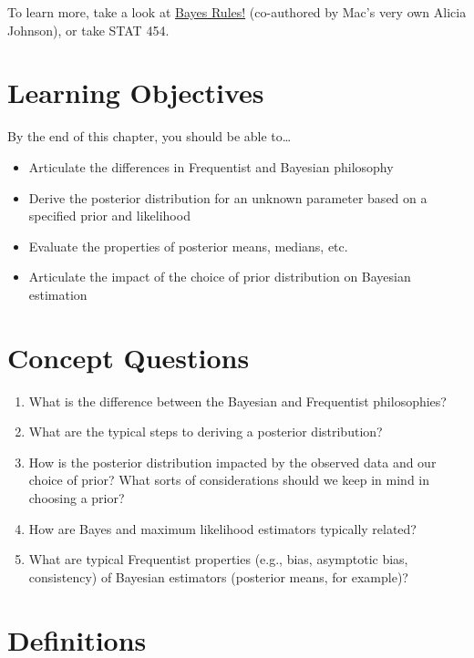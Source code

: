 \documentclass[
  letterpaper,
  DIV=11,
  numbers=noendperiod]{scrreprt}
\providecommand{\tightlist}{%
  \setlength{\itemsep}{0pt}\setlength{\parskip}{0pt}}\usepackage{longtable,booktabs,array}
\begin{document}
To learn more, take a look at
\href{https://www.bayesrulesbook.com/}{Bayes Rules!} (co-authored by
Mac's very own Alicia Johnson), or take STAT 454.

\section{Learning Objectives}\label{learning-objectives-7}

By the end of this chapter, you should be able to\ldots{}

\begin{itemize}
\tightlist
\item
  Articulate the differences in Frequentist and Bayesian philosophy
\item
  Derive the posterior distribution for an unknown parameter based on a
  specified prior and likelihood
\item
  Evaluate the properties of posterior means, medians, etc.
\item
  Articulate the impact of the choice of prior distribution on Bayesian
  estimation
\end{itemize}

\section{Concept Questions}\label{concept-questions-7}

\begin{enumerate}
\def\labelenumi{\arabic{enumi}.}
\tightlist
\item
  What is the difference between the Bayesian and Frequentist
  philosophies?
\item
  What are the typical steps to deriving a posterior distribution?
\item
  How is the posterior distribution impacted by the observed data and
  our choice of prior? What sorts of considerations should we keep in
  mind in choosing a prior?
\item
  How are Bayes and maximum likelihood estimators typically related?
\item
  What are typical Frequentist properties (e.g., bias, asymptotic bias,
  consistency) of Bayesian estimators (posterior means, for example)?
\end{enumerate}

\section{Definitions}\label{definitions-7}
\end{document}
